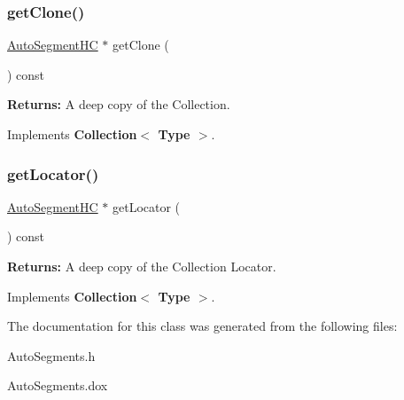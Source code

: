 \subsubsection{\texorpdfstring{get\+Clone()}{getClone()}}
{\footnotesize\ttfamily \hyperlink{namespaceKatabatic_acb3628dc7705fefe38a665cfe43efa6e}{Auto\+Segment\+HC} $\ast$ get\+Clone (\begin{DoxyParamCaption}{ }\end{DoxyParamCaption}) const\hspace{0.3cm}{\ttfamily [virtual]}}

{\bfseries Returns\+:} A deep copy of the Collection. 

Implements \textbf{ Collection$<$ Type $>$}.

\mbox{\label{classKatabatic_1_1AutoSegments__OnContact_a07665c070fcc269aec02ce842f384483}} 
\subsubsection{\texorpdfstring{get\+Locator()}{getLocator()}}
{\footnotesize\ttfamily \hyperlink{namespaceKatabatic_acb3628dc7705fefe38a665cfe43efa6e}{Auto\+Segment\+HC} $\ast$ get\+Locator (\begin{DoxyParamCaption}{ }\end{DoxyParamCaption}) const\hspace{0.3cm}{\ttfamily [virtual]}}

{\bfseries Returns\+:} A deep copy of the Collection Locator. 

Implements \textbf{ Collection$<$ Type $>$}.



The documentation for this class was generated from the following files\+:\begin{DoxyCompactItemize}
\item 
Auto\+Segments.\+h\item 
Auto\+Segments.\+dox\end{DoxyCompactItemize}
